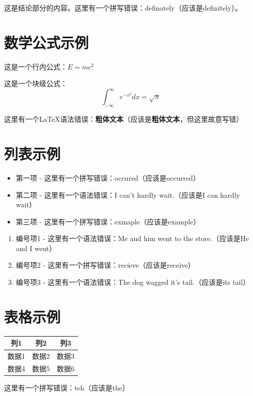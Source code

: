 \documentclass{article}
\begin{document}
这是结论部分的内容。这里有一个拼写错误：definately（应该是definitely）。

\section{数学公式示例}

这是一个行内公式：$E = mc^2$

这是一个块级公式：
\begin{equation}
\int_{-\infty}^{\infty} e^{-x^2} dx = \sqrt{\pi}
\end{equation}

这里有一个LaTeX语法错误：\textbf{粗体文本}（应该是\textbf{粗体文本}，但这里故意写错）

\section{列表示例}

\begin{itemize}
  \item 第一项 - 这里有一个拼写错误：occured（应该是occurred）
  \item 第二项 - 这里有一个语法错误：I can't hardly wait.（应该是I can hardly wait）
  \item 第三项 - 这里有一个拼写错误：exmaple（应该是example）
\end{itemize}

\begin{enumerate}
  \item 编号项1 - 这里有一个语法错误：Me and him went to the store.（应该是He and I went）
  \item 编号项2 - 这里有一个拼写错误：recieve（应该是receive）
  \item 编号项3 - 这里有一个语法错误：The dog wagged it's tail.（应该是its tail）
\end{enumerate}

\section{表格示例}

\begin{tabular}{|c|c|c|}
\hline
列1 & 列2 & 列3 \\
\hline
数据1 & 数据2 & 数据3 \\
数据4 & 数据5 & 数据6 \\
\hline
\end{tabular}

这里有一个拼写错误：teh（应该是the）
\end{document}
